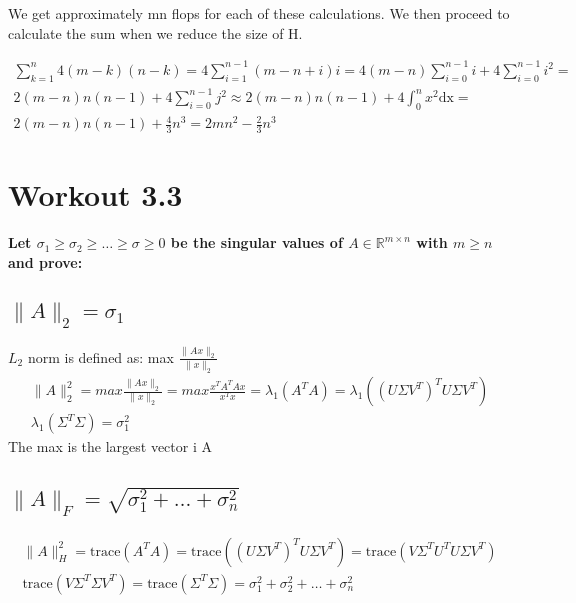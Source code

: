 \documentclass[a4paper]{article}
\begin{document}
We get approximately mn flops for each of these calculations. We then proceed to calculate the sum when we reduce the size of H.

\begin{equation}
	\begin{aligned}
		\sum_{k=1}^{n} 4(m-k)(n-k) = 4 \sum_{i=1}^{n-1}  (m - n + i)i = 4(m - n )\sum_{i=0}^{n-1} i +4 \sum_{i=0}^{n-1}i^2 = \\
		2(m-n)n(n-1)+4 \sum_{i=0}^{n-1} j^2 \approx 2(m-n)n(n-1)+4 \int_{0}^{n}   x^2\text{dx} = \\
		2(m-n)n(n-1)+ \frac{4}{3}n^{3} = 2mn^2 - \frac{2}{3}n^{3} 
	\end{aligned}
\end{equation}



\section{Workout 3.3}
\textbf{Let $\sigma_1 \ge \sigma_2 \ge  \ldots \ge \sigma \ge 0$ be the singular values of $A \in \mathbb{R}^{m\times n}$ with $m \ge n$ and prove:}
\subsection{$\|A\|_2 = \sigma_1$}
$L_2$ norm is defined as: max $\frac{\|Ax\|_2}{\|x\|_2}$
\begin{equation}
	\begin{aligned}
	\|A\|^2_2 = max \frac{\|Ax\|_2}{\|x\|_2} = max \frac{x^{T}A^{T}Ax}{x^{T}x} = \lambda_1 (A^{T}A) = \lambda_1((U\Sigma V^{T})^{T}U \Sigma V^{T}) \\
	\lambda_1(\Sigma^{T} \Sigma) = \sigma_1^2
	\end{aligned}
\end{equation}
The max is the largest vector i A
\subsection{$\|A\|_F = \sqrt{\sigma^2_1 +\ldots +\sigma^2_n}$ }
\begin{equation}
	\begin{aligned}
		\|A\|^2_H = \text{trace}(A^{T}A)=\text{trace}((U \Sigma V^{T})^{T}U \Sigma V^{T}) = \text{trace}(V \Sigma^{T}U^{T}U\Sigma V^{T}) \\
		\text{trace}(V \Sigma^{T} \Sigma V^{T}) = \text{trace}(\Sigma^{T} \Sigma) = \sigma^2_1 + \sigma^2_2 + \ldots + \sigma^2_n 
	\end{aligned}
\end{equation}
\end{document}
